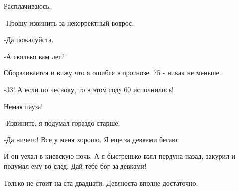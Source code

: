 Расплачиваюсь. 

-Прошу извинить за некорректный вопрос.

-Да пожалуйста.

-А сколько вам лет?

Оборачивается и вижу что я ошибся в прогнозе. 75 - никак не меньше.

-33! А если по чесноку, то в этом году 60 исполнилось! 

Немая пауза!

-Извините, я подумал гораздо старше!

-Да ничего! Все у меня хорошо. Я еще за девками бегаю.

И он уехал в киевскую ночь. А я быстренько взял пердуна назад, закурил и
подумал ему во след. Дай тебе бог за девками!

Только не стоит на ста двадцати. Девяноста вполне достаточно.
